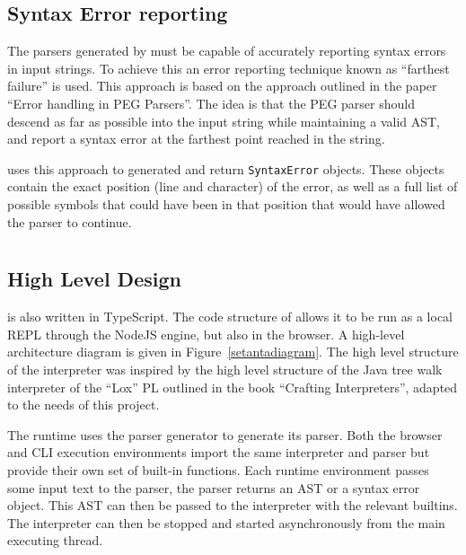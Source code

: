 \subsection{Syntax Error reporting}

The parsers generated by \tsPEG{} must be capable of accurately reporting syntax errors in input strings. To achieve this an error reporting technique known as ``farthest failure'' is used. This approach is based on the approach outlined in the paper ``Error handling in PEG Parsers''\cite{pegerrors}. The idea is that the PEG parser should descend as far as possible into the input string while maintaining a valid AST, and report a syntax error at the farthest point reached in the string.

\tsPEG{} uses this approach to generated and return \verb|SyntaxError| objects. These objects contain the exact position (line and character) of the error, as well as a full list of possible symbols that could have been in that position that would have allowed the parser to continue.

\section{\Setanta{}} \label{setantasolution}

\subsection{High Level Design}
\Setanta{} is also written in TypeScript. The code structure of \Setanta{} allows it to be run as a local REPL through the NodeJS engine, but also in the browser. A high-level architecture diagram is given in Figure~\ref{setantadiagram}. The high level structure of the \Setanta{} interpreter was inspired by the high level structure of the Java tree walk interpreter of the ``Lox'' PL outlined in the book ``Crafting Interpreters''\cite{crafting-interpreters}, adapted to the needs of this project.

The \Setanta{} runtime uses the \tsPEG{} parser generator to generate its parser. Both the browser and CLI execution environments import the same interpreter and parser but provide their own set of built-in functions. Each runtime environment passes some input text to the parser, the parser returns an AST or a syntax error object. This AST can then be passed to the interpreter with the relevant builtins. The interpreter can then be stopped and started asynchronously from the main executing thread.

